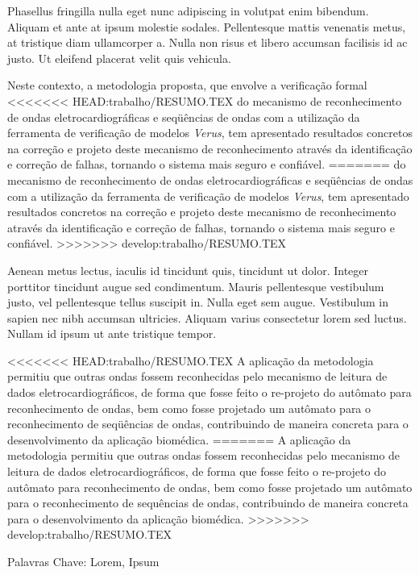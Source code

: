 
Phasellus fringilla nulla eget nunc adipiscing in volutpat enim bibendum. 
Aliquam et ante at ipsum molestie sodales. Pellentesque mattis venenatis metus, 
at tristique diam ullamcorper a. Nulla non risus et libero accumsan facilisis 
id ac justo. Ut eleifend placerat velit quis vehicula. 

Neste contexto, a metodologia proposta, que envolve a verificação formal
<<<<<<< HEAD:trabalho/RESUMO.TEX
do mecanismo de reconhecimento de ondas eletrocardiográficas e
seqüências de ondas com a utilização da ferramenta de verificação
de modelos {\em Verus}, tem apresentado resultados concretos na
correção e projeto deste mecanismo de reconhecimento através da
identificação e correção de falhas, tornando o sistema mais seguro e
confiável.
=======
do mecanismo de reconhecimento de ondas eletrocardiogr\'aficas e
seqüências de ondas com a utilização da ferramenta de verificação
de modelos {\em Verus}, tem apresentado resultados concretos na
correção e projeto deste mecanismo de reconhecimento atrav\'es da
identificação e correção de falhas, tornando o sistema mais seguro e
confi\'avel.
>>>>>>> develop:trabalho/RESUMO.TEX

Aenean metus lectus, iaculis id tincidunt quis, 
tincidunt ut dolor. Integer porttitor tincidunt augue sed condimentum. Mauris pellentesque 
vestibulum justo, vel pellentesque tellus suscipit in. Nulla eget sem augue. 
Vestibulum in sapien nec nibh accumsan ultricies. Aliquam varius consectetur lorem sed luctus. 
Nullam id ipsum ut ante tristique tempor.

<<<<<<< HEAD:trabalho/RESUMO.TEX
A aplicação da metodologia permitiu que outras ondas fossem
reconhecidas pelo mecanismo de leitura de dados
eletrocardiográficos, de forma que fosse feito o
re-projeto do autômato para reconhecimento de ondas, bem como
fosse projetado um autômato para o reconhecimento de seqüências
de ondas, contribuindo de maneira concreta para o desenvolvimento
da aplicação biomédica.
=======
A aplica\c{c}\~ao da metodologia permitiu que outras ondas fossem
reconhecidas pelo mecanismo de leitura de dados
eletrocardiogr\'aficos, de forma que fosse feito o
re-projeto do autômato para reconhecimento de ondas, bem como
fosse projetado um aut\^omato para o reconhecimento de sequ\^encias
de ondas, contribuindo de maneira concreta para o desenvolvimento
da aplicação biom\'edica.
>>>>>>> develop:trabalho/RESUMO.TEX


Palavras Chave: Lorem, Ipsum
